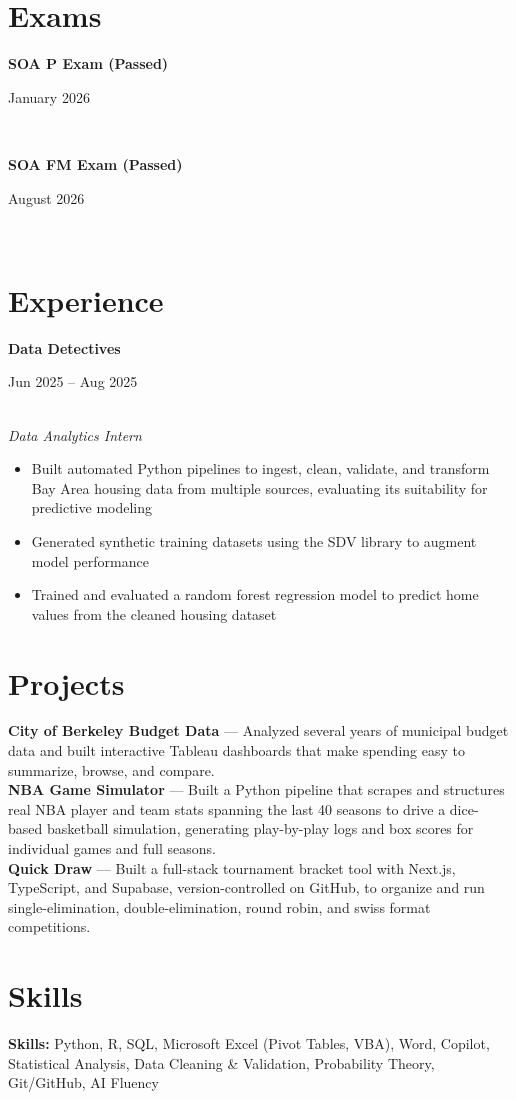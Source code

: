 \documentclass[11pt,letterpaper]{article}
\newcommand{\entry}[3]{%
  \noindent\begin{minipage}[t]{0.72\textwidth}\raggedright\textbf{#1}\end{minipage}%
  \hfill\begin{minipage}[t]{0.26\textwidth}\raggedleft\small\color{gray}#2\end{minipage}\\
  \textit{#3}\par\vspace{2pt}
}
\newcommand{\examentry}[2]{%
  \noindent\begin{minipage}[t]{0.72\textwidth}\raggedright\textbf{#1}\end{minipage}%
  \hfill\begin{minipage}[t]{0.26\textwidth}\raggedleft\small\color{gray}#2\end{minipage}\\[1pt]
}
\begin{document}


\vspace{4pt}



\section*{Exams}
\examentry{SOA P Exam (Passed)}{January 2026}
\examentry{SOA FM Exam (Passed)}{August 2026}

\section*{Experience}



\entry{Data Detectives}{Jun 2025 -- Aug 2025}{Data Analytics Intern}
\begin{itemize}
  \item Built automated Python pipelines to ingest, clean, validate, and transform Bay Area housing data from multiple sources, evaluating its suitability for predictive modeling
  \item Generated synthetic training datasets using the SDV library to augment model performance
  \item Trained and evaluated a random forest regression model to predict home values from the cleaned housing dataset
\end{itemize}



\section*{Projects}
\textbf{City of Berkeley Budget Data} --- Analyzed several years of municipal budget data and built interactive Tableau dashboards that make spending easy to summarize, browse, and compare.\\[4pt]
\textbf{NBA Game Simulator} --- Built a Python pipeline that scrapes and structures real NBA player and team stats spanning the last 40 seasons to drive a dice-based basketball simulation, generating play-by-play logs and box scores for individual games and full seasons.\\[4pt]
\textbf{Quick Draw} --- Built a full-stack tournament bracket tool with Next.js, TypeScript, and Supabase, version-controlled on GitHub, to organize and run single-elimination, double-elimination, round robin, and swiss format competitions.

\section*{Skills}
\textbf{Skills:} Python, R, SQL, Microsoft Excel (Pivot Tables, VBA), Word, Copilot, Statistical Analysis, Data Cleaning \& Validation, Probability Theory, Git/GitHub, AI Fluency
\end{document}
